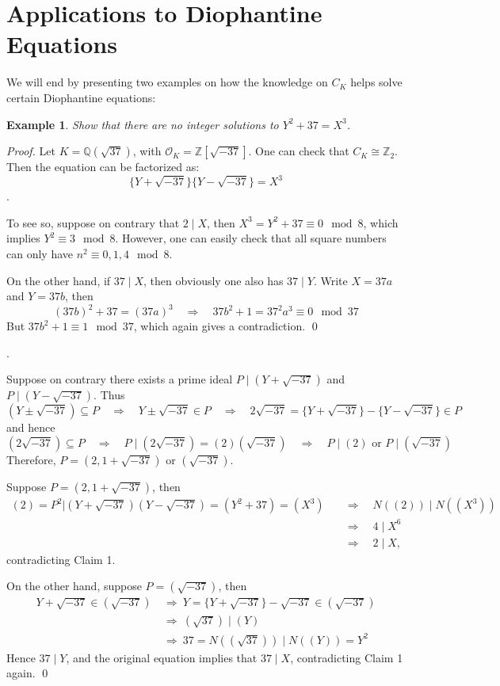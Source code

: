 \documentclass[11pt]{book}
\newtheorem{example}[theorem]{Example}
\begin{document}
\section{Applications to Diophantine Equations}
We will end by presenting two examples on how the knowledge on $C_K$ helps solve certain Diophantine equations:
\begin{example}
Show that there are no integer solutions to $Y^2+37 = X^3$.
\end{example}
\begin{proof}
Let $K = \mathbb{Q}(\sqrt{37})$, with $\mathcal{O}_K = \mathbb{Z}[\sqrt{-37}]$. One can check that $C_K \cong \mathbb{Z}_2$. Then the equation can be factorized as:
$$\{Y + \sqrt{-37}\}\{Y - \sqrt{-37}\} = X^3$$
. 

To see so, suppose on contrary that $2 \mid X$, then $X^3 = Y^2 + 37 \equiv 0 \mod 8$, which implies $Y^2 \equiv 3 \mod 8$. However, one can easily check that all square numbers can only have $n^2 \equiv 0, 1, 4 \mod8 $.

On the other hand, if $37 \mid X$, then obviously one also has $37 \mid Y$. Write $X = 37a$ and $Y = 37b$, then
$$(37b)^2 + 37 = (37a)^3 \quad \Rightarrow \quad 37b^2 + 1 = 37^2a^3 \equiv 0 \mod 37$$
But $37b^2 + 1 \equiv 1 \mod 37$, which again gives a contradiction. \qed

\medskip 
{}. 

Suppose on contrary there exists a prime ideal $P \mid (Y + \sqrt{-37})$ and $ P \mid (Y - \sqrt{-37})$. Thus 
$$(Y \pm \sqrt{-37}) \subseteq P \quad \Rightarrow  \quad Y \pm \sqrt{-37} \in P  \quad \Rightarrow  \quad 2\sqrt{-37} = \{Y + \sqrt{-37}\} - \{Y - \sqrt{-37}\} \in P$$  
and hence
$$(2\sqrt{-37}) \subseteq P  \quad
\Rightarrow  \quad P \mid (2\sqrt{-37}) = (2)(\sqrt{-37})  \quad \Rightarrow  \quad P \mid (2) \text{ or } P \mid (\sqrt{-37})$$
Therefore, $P = (2, 1+ \sqrt{-37})$ or $(\sqrt{-37})$. 

Suppose $P = (2, 1+ \sqrt{-37})$, then 
\begin{align*}
(2) = P^2 | (Y+\sqrt{-37})(Y-\sqrt{-37}) = (Y^2+37) = (X^3) \quad &\Rightarrow \quad N((2)) \mid N((X^3)) \\
&\Rightarrow \quad  4 \mid X^6 \\ &\Rightarrow \quad 2 \mid X,\end{align*}
contradicting Claim 1.

On the other hand, suppose $P = (\sqrt{-37})$, then
\begin{align*}
Y + \sqrt{-37} \in (\sqrt{-37}) \ &\Rightarrow \ Y = \{Y + \sqrt{-37}\} - \sqrt{-37} \in (\sqrt{-37}) \\ &\Rightarrow \ (\sqrt{37}) \mid (Y) \\
&\Rightarrow \  37 = N((\sqrt{37})) \mid N((Y)) = Y^2 
\end{align*}
Hence $37 \mid Y$, and the original equation implies that $37 \mid X$, contradicting Claim 1 again.  \qed


\end{proof}
\end{document}
